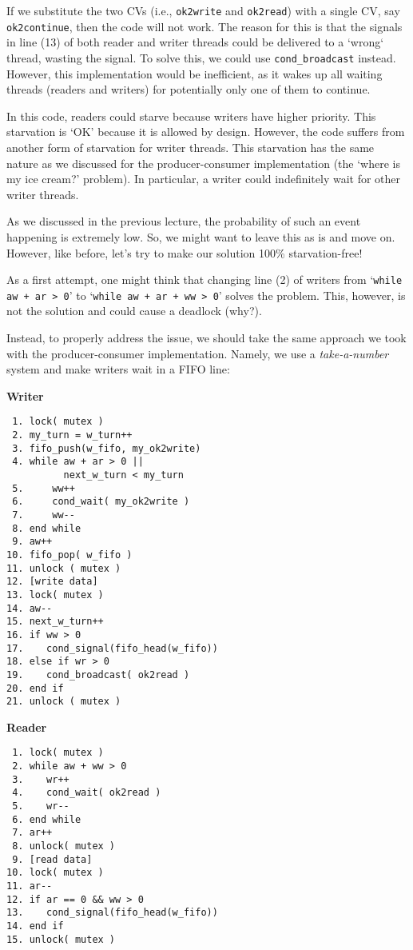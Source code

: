 If we substitute the two CVs (i.e., \texttt{ok2write} and \texttt{ok2read}) with a single CV, say \texttt{ok2continue}, then the code will not work.
The reason for this is that the signals in line (13) of both reader and writer threads could be delivered to a `wrong` thread, wasting the signal.
To solve this, we could use \texttt{cond\_broadcast} instead.
However, this implementation would be inefficient, as it wakes up all waiting threads (readers and writers) for potentially only one of them to continue.

In this code, readers could starve because writers have higher priority.
This starvation is `OK' because it is allowed by design.
However, the code suffers from another form of starvation for writer threads.
This starvation has the same nature as we discussed for the producer-consumer implementation (the `where is my ice cream?' problem).
In particular, a writer could indefinitely wait for other writer threads.

As we discussed in the previous lecture, the probability of such an event happening is extremely low.
So, we might want to leave this as is and move on.
However, like before, let's try to make our solution 100\% starvation-free!

As a first attempt, one might think that changing line (2) of writers from `\texttt{while aw + ar > 0}' to `\texttt{while aw + ar + ww > 0}' solves the problem.
This, however, is not the solution and could cause a deadlock (why?).

Instead, to properly address the issue, we should take the same approach we took with the producer-consumer implementation.
Namely, we use a \emph{take-a-number} system and make writers wait in a FIFO line:

\begin{multicols}{2}
    \textbf{Writer}\vspace{-2em}
    \begin{verbatim}
 1. lock( mutex )
 2. my_turn = w_turn++
 3. fifo_push(w_fifo, my_ok2write)
 4. while aw + ar > 0 ||
          next_w_turn < my_turn
 5.     ww++
 6.     cond_wait( my_ok2write )
 7.     ww--
 8. end while
 9. aw++
10. fifo_pop( w_fifo )
11. unlock ( mutex )
12. [write data]
13. lock( mutex )
14. aw--
15. next_w_turn++
16. if ww > 0
17.    cond_signal(fifo_head(w_fifo))
18. else if wr > 0
19.    cond_broadcast( ok2read )
20. end if
21. unlock ( mutex )
    \end{verbatim}
    \columnbreak
    \textbf{Reader}\vspace{-2em}
    \begin{verbatim}
 1. lock( mutex )
 2. while aw + ww > 0
 3.    wr++
 4.    cond_wait( ok2read )
 5.    wr--
 6. end while
 7. ar++
 8. unlock( mutex )
 9. [read data]
10. lock( mutex )
11. ar--
12. if ar == 0 && ww > 0
13.    cond_signal(fifo_head(w_fifo))
14. end if
15. unlock( mutex )







    \end{verbatim}
\end{multicols}
\vspace{-2em}


